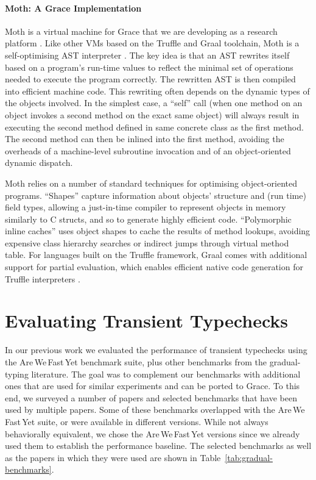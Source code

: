 \documentclass[sigplan,10pt,review,screen]{acmart}\settopmatter{printfolios=true}
\def\AWFY{Are\,We\,Fast\,Yet\xspace}
\begin{document}
\paragraph{Moth: A Grace Implementation}
Moth is a virtual machine for Grace that we are developing as a
research platform \cite{roberts-and-co-ecoop-2019}. Like other VMs
based on the Truffle and Graal toolchain, Moth is a self-optimising
AST interpreter \cite{Wurthinger:2012:SelfOptAST}. 
The key idea is that an AST rewrites itself based on a program's run-time values
to reflect the minimal set of operations needed to execute the program
correctly. The rewritten AST is then compiled into efficient machine
code. This rewriting often depends on the dynamic types of the
objects involved. In the simplest case, a ``self'' call (when one method
on an object invokes a second method on the exact same object) will
always result in executing the second method defined in same concrete
class as the first method. The second method can then be inlined into
the first method, avoiding the overheads of a machine-level subroutine
invocation and of an object-oriented dynamic dispatch.


Moth relies on a number of standard techniques for optimising
object-oriented programs.
``Shapes'' \citep{woss2014object} capture information about objects'
structure and (run time) 
field types, allowing a just-in-time compiler to
represent objects in memory similarly to C structs, and so to 
generate highly efficient code.
``Polymorphic inline caches''
\citep{Hoelzle:91:PIC} uses object shapes to cache the results of
method lookups, avoiding expensive class hierarchy searches or
indirect jumps through virtual method table. 
For languages built on the Truffle framework,
Graal comes with  additional support for partial evaluation,
which enables efficient native code generation for
Truffle interpreters \citep{Wurthinger:2017:PPE}.



\section{Evaluating Transient Typechecks}
\label{s-eval}

In our previous work \cite{roberts-and-co-ecoop-2019} we evaluated the
performance of transient typechecks using the \AWFY
benchmark suite, plus other
benchmarks from the gradual-typing literature.
The goal was to complement our benchmarks with additional ones that are
used for similar experiments and can be ported to Grace.
To this end, we surveyed a number of papers
\citep{Takikawa2016,Vitousek2017,Muehlboeck2017,Bauman2017,Richards2017,Stulova2016,Greenman2018}
and selected benchmarks that have been used by multiple papers.
Some of these benchmarks overlapped with the \AWFY suite,
or were available in different versions.
While not always behaviorally equivalent,
we chose the \AWFY versions since we already used them to
establish the performance baseline.
The selected benchmarks as well as the papers in which they were used are shown in
Table~\ref{tab:gradual-benchmarks}.
\end{document}
